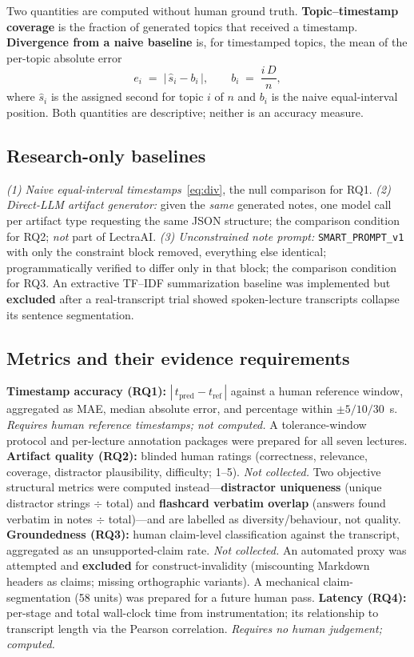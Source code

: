 \documentclass[conference]{IEEEtran}
\begin{document}
Two quantities are computed without human ground truth. \textbf{Topic--timestamp coverage} is the fraction of generated topics that received a timestamp. \textbf{Divergence from a naive baseline} is, for timestamped topics, the mean of the per-topic absolute error
\begin{equation}
e_i \;=\; \bigl|\, \hat{s}_i - b_i \,\bigr|, \qquad
b_i \;=\; \frac{i\,D}{n},
\label{eq:div}
\end{equation}
where $\hat{s}_i$ is the assigned second for topic $i$ of $n$ and $b_i$ is the naive equal-interval position. Both quantities are descriptive; neither is an accuracy measure.

\subsection{Research-only baselines}
\emph{(1) Naive equal-interval timestamps}~\eqref{eq:div}, the null comparison for RQ1. \emph{(2) Direct-LLM artifact generator:} given the \emph{same} generated notes, one model call per artifact type requesting the same JSON structure; the comparison condition for RQ2; \emph{not} part of LectraAI. \emph{(3) Unconstrained note prompt:} \texttt{SMART\_PROMPT\_v1} with only the constraint block removed, everything else identical; programmatically verified to differ only in that block; the comparison condition for RQ3. An extractive TF--IDF summarization baseline was implemented but \textbf{excluded} after a real-transcript trial showed spoken-lecture transcripts collapse its sentence segmentation.

\subsection{Metrics and their evidence requirements}
\textbf{Timestamp accuracy (RQ1):} $|\,t_{\text{pred}} - t_{\text{ref}}\,|$ against a human reference window, aggregated as MAE, median absolute error, and percentage within $\pm5/10/30$~s. \emph{Requires human reference timestamps; not computed.} A tolerance-window protocol and per-lecture annotation packages were prepared for all seven lectures.
\textbf{Artifact quality (RQ2):} blinded human ratings (correctness, relevance, coverage, distractor plausibility, difficulty; 1--5). \emph{Not collected.} Two objective structural metrics were computed instead---\textbf{distractor uniqueness} (unique distractor strings $\div$ total) and \textbf{flashcard verbatim overlap} (answers found verbatim in notes $\div$ total)---and are labelled as diversity/behaviour, not quality.
\textbf{Groundedness (RQ3):} human claim-level classification against the transcript, aggregated as an unsupported-claim rate. \emph{Not collected.} An automated proxy was attempted and \textbf{excluded} for construct-invalidity (miscounting Markdown headers as claims; missing orthographic variants). A mechanical claim-segmentation (58 units) was prepared for a future human pass.
\textbf{Latency (RQ4):} per-stage and total wall-clock time from instrumentation; its relationship to transcript length via the Pearson correlation. \emph{Requires no human judgement; computed.}
\end{document}

